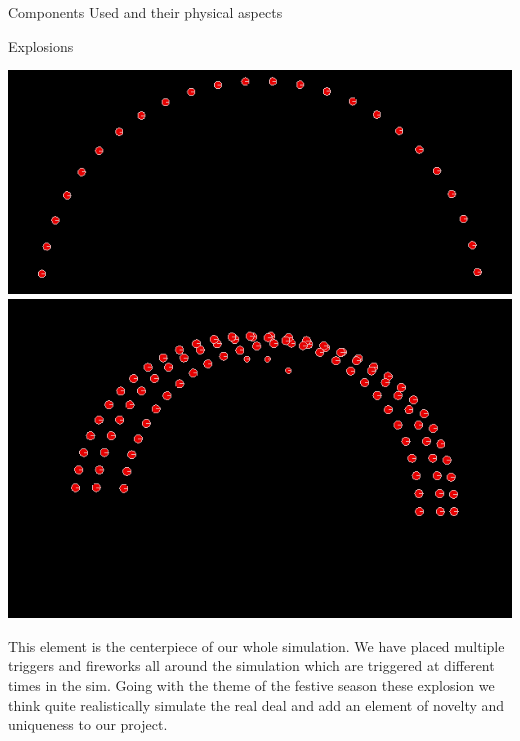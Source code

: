 \documentclass[a4paper,12pt]{article}
\begin{document}
\begin{section}{Components Used and their physical aspects}
\begin{subsection}{Explosions}
\begin{center}
\includegraphics[scale=.33]{./Images/Explosion00.png}
\includegraphics[scale=.22]{./Images/Explosion02.png}
\end{center}
This element is the centerpiece of our whole simulation. We have placed multiple triggers and fireworks all around the simulation
which are triggered at different times in the sim. Going with the theme of the festive season these explosion we think quite
realistically simulate the real deal and add an element of  novelty and uniqueness to our project.
\end{subsection}


\end{section}
\end{document}
